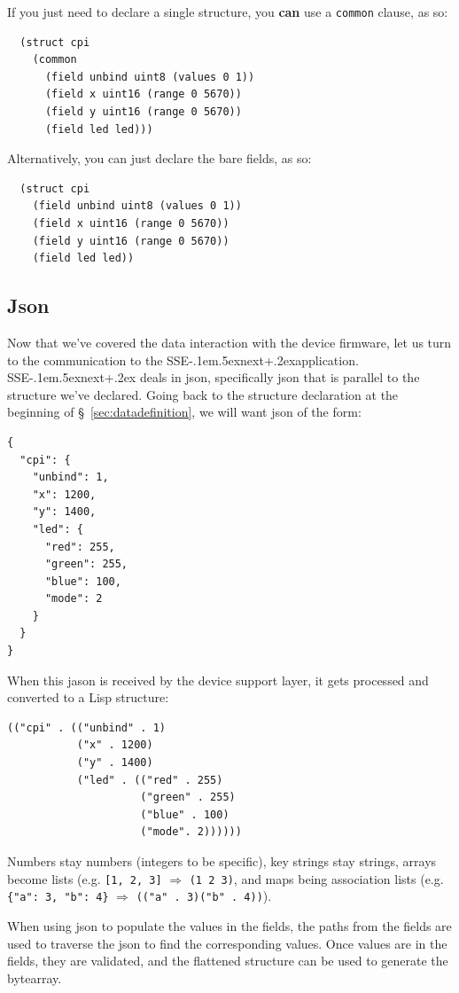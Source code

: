 \documentclass[12pt]{article}
\def\SSEnext{SSE\kern-.1em\lower.5ex\hbox{\footnotesize next}\kern+.2ex}
\def\SSEnext{SSE\kern-.1em\lower.5ex\hbox{\footnotesize next}\kern+.2ex}
\begin{document}
If you just need to declare a single
structure, you {\bf can} use a \verb|common| clause, as so:

\begin{verbatim}
  (struct cpi
    (common
      (field unbind uint8 (values 0 1))
      (field x uint16 (range 0 5670))
      (field y uint16 (range 0 5670))
      (field led led)))
\end{verbatim}

Alternatively, you can just declare the bare fields, as so:

\begin{verbatim}
  (struct cpi
    (field unbind uint8 (values 0 1))
    (field x uint16 (range 0 5670))
    (field y uint16 (range 0 5670))
    (field led led))
\end{verbatim}

\subsection{Json}

Now that we've covered the data interaction with the device firmware,
let us turn to the communication to the \SSEnext application. \SSEnext
deals in json, specifically json that is parallel to the structure we've
declared. Going back to the structure declaration at the beginning of
\S~\ref{sec:datadefinition}, we will want json of the form:

\begin{verbatim}
{
  "cpi": {
    "unbind": 1,
    "x": 1200,
    "y": 1400,
    "led": {
      "red": 255,
      "green": 255,
      "blue": 100,
      "mode": 2
    }
  }
}
\end{verbatim}

When this jason is received by the device support layer, it gets
processed and converted to a Lisp structure: 

\begin{verbatim}
(("cpi" . (("unbind" . 1)
           ("x" . 1200)
           ("y" . 1400)
           ("led" . (("red" . 255)
                     ("green" . 255)
                     ("blue" . 100)
                     ("mode". 2))))))
\end{verbatim}

Numbers stay numbers (integers to be specific), key strings stay
strings, arrays become lists (e.g. \verb|[1, 2, 3]| $\Rightarrow$
\verb|(1 2 3)|, and maps being association lists (e.g.
\verb|{"a": 3, "b": 4}| $\Rightarrow$ \verb|(("a" . 3)("b" . 4))|).

When using json to populate the values in the fields, the paths from
the fields are used to traverse the json to find the corresponding
values. Once values are in the fields, they are validated, and the
flattened structure can be used to generate the bytearray.
\end{document}
